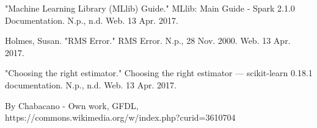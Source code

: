 \documentclass[9pt,twocolumn,twoside]{idsi}
\begin{document}
\begin{thebibliography}{9}


"Machine Learning Library (MLlib) Guide." MLlib: Main Guide - Spark 2.1.0 Documentation. N.p., n.d. Web. 13 Apr. 2017.
 
Holmes, Susan. "RMS Error." RMS Error. N.p., 28 Nov. 2000. Web. 13 Apr. 2017.
 
"Choosing the right estimator." Choosing the right estimator — scikit-learn 0.18.1 documentation. N.p., n.d. Web. 13 Apr. 2017.

By Chabacano - Own work, GFDL, https://commons.wikimedia.org/w/index.php?curid=3610704

\end{thebibliography}
\end{document}
